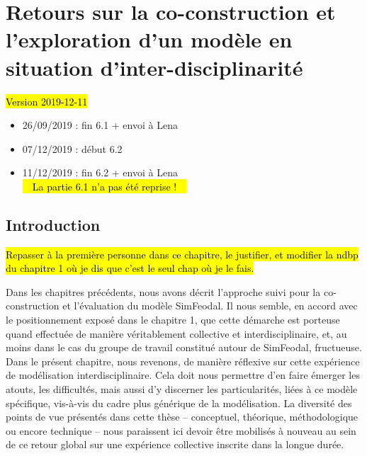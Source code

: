\setcounter{chapter}{5}
\graphicspath{{chap6/}}

\chapter{Retours sur la co-construction et l'exploration d'un modèle en situation d'inter-disciplinarité}
\label{chap:chap6}
\vspace*{-2.5em}
\begin{center}
	{\large \hl{Version 2019-12-11}}
\end{center}
\vspace*{-1em}
\begin{itemize}
	\item 26/09/2019 : fin 6.1 + envoi à Lena
	\item 07/12/2019 : début 6.2
	\item 11/12/2019 : fin 6.2 + envoi à Lena\\
	 \hl{\faWarning~~La partie 6.1 n'a pas été reprise !~~\faWarning}
\end{itemize} 
\vspace*{-1em}
\setcounter{minitocdepth}{2}
\minitoc
\clearpage
{}

\section*{Introduction}

\begin{center}
	\hl{Repasser à la première personne dans ce chapitre, le justifier, et modifier la ndbp du chapitre 1 où je dis que c'est le seul chap où je le fais.}
\end{center}

Dans les chapitres précédents, nous avons décrit l'approche suivi pour la co-construction et l'évaluation du modèle SimFeodal.
Il nous semble, en accord avec le positionnement exposé dans le chapitre 1, que cette démarche est porteuse quand effectuée de manière véritablement collective et interdisciplinaire, et, au moins dans le cas du groupe de travail constitué autour de SimFeodal, fructueuse.
Dans le présent chapitre, nous revenons, de manière réflexive sur cette expérience de modélisation interdisciplinaire.
Cela doit nous permettre d'en faire émerger les atouts, les difficultés, mais aussi d'y discerner les particularités, liées à ce modèle spécifique, vis-à-vis du cadre plus générique de la modélisation.
La diversité des points de vue présentés dans cette thèse -- conceptuel, théorique, méthodologique ou encore technique -- nous paraissent ici devoir être mobilisés à nouveau au sein de ce retour global sur une expérience collective inscrite dans la longue durée.

